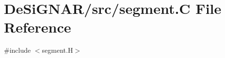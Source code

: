 \hypertarget{segment_8_c}{}\section{De\+Si\+G\+N\+A\+R/src/segment.C File Reference}
\label{segment_8_c}
{\ttfamily \#include $<$segment.\+H$>$}\newline
